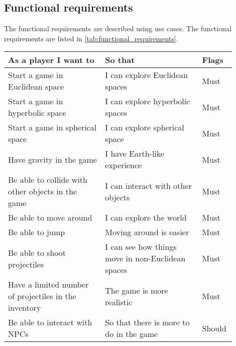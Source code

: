 \subsection{Functional requirements}
The functional requirements are described using use cases.
The functional requirements are listed in \autoref*{tab:functional_requirements}.

\begin{table}[H]
    \begin{tabular}{p{0.4\linewidth}|p{0.4\linewidth}|p{0.1\linewidth}}
        \hline
        \textbf{As a player I want to}                             & \textbf{So that}                                                   & \textbf{Flags} \\ \hline
        Start a game in Euclidean space                            & I can explore Euclidean spaces                                     & Must           \\
        Start a game in hyperbolic space                           & I can explore hyperbolic spaces                                    & Must           \\
        Start a game in spherical space                            & I can explore spherical space                                      & Must           \\
        Have gravity in the game                                   & I have Earth-like experience                                       & Must           \\
        Be able to collide with other objects in the game          & I can interact with other objects                                  & Must           \\
        Be able to move around                                     & I can explore the world                                            & Must           \\
        Be able to jump                                            & Moving around is easier                                            & Must           \\
        Be able to shoot projectiles                               & I can see how things move in non-Euclidean spaces                  & Must           \\
        Have a limited number of projectiles in the inventory      & The game is more realistic                                         & Must           \\
        Be able to interact with NPCs                              & So that there is more to do in the game                            & Should         \\

\end{tabular}
\end{table}
